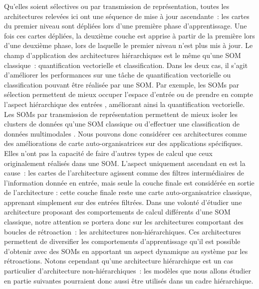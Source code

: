 \documentclass[../main]{subfiles}
\begin{document}
Qu'elles soient sélectives ou par transmission de représentation, toutes les architectures relevées ici ont une séquence de mise à jour ascendante~: les cartes du premier niveau sont dépliées lors d'une première phase d'apprentissage. Une fois ces cartes dépliées, la deuxième couche est apprise à partir de la première lors d'une deuxième phase, lors de laquelle le premier niveau n'est plus mis à jour.
Le champ d'application des architectures hiérarchiques est le même qu'une SOM classique~: quantification vectorielle et classification.
Dans les deux cas, il s'agit d'améliorer les performances sur une tâche de quantification vectorielle ou classification pouvant être réalisée par une SOM. Par exemple, les SOMs par sélection permettent de mieux occuper l'espace d'entrée \cite{barbalho_hierarchical_2001} ou de prendre en compte l'aspect hiérarchique des entrées \cite{miikkulainen}, améliorant ainsi la quantification vectorielle. Les SOMs par transmission de représentation permettent de mieux isoler les clusters de données qu'une SOM classique \cite{lampinen_clustering_1992} ou d'effectuer une classification de données multimodales \cite{mici_self-organizing_2018}.
Nous pouvons donc considérer ces architectures comme des améliorations de carte auto-organisatrices sur des applications spécifiques.
Elles n'ont pas la capacité de faire d'autres types de calcul que ceux originalement réalisés dans une SOM.
L'aspect uniquement ascendant en est la cause~: les cartes de l'architecture agissent comme des filtres intermédiaires de l'information donnée en entrée, mais seule la couche finale est considérée en sortie de l'architecture : cette couche finale reste une carte auto-organisatrice classique, apprenant simplement sur des entrées filtrées.
Dans une volonté d'étudier une architecture proposant des comportements de calcul différents d'une SOM classique, notre attention se portera donc sur les architectures comportant des boucles de rétroaction~: les architectures non-hiérarchiques.
Ces architectures permettent de diversifier les comportements d'apprentissage qu'il est possible d'obtenir avec des SOMs en apportant un aspect dynamique au système par les rétroactions. Notons cependant qu'une architecture hiérarchique est un cas particulier d'architecture non-hiérarchiques~: les modèles que nous allons étudier en partie suivantes pourraient donc aussi être utilisés dans un cadre hiérarchique.
\end{document}
